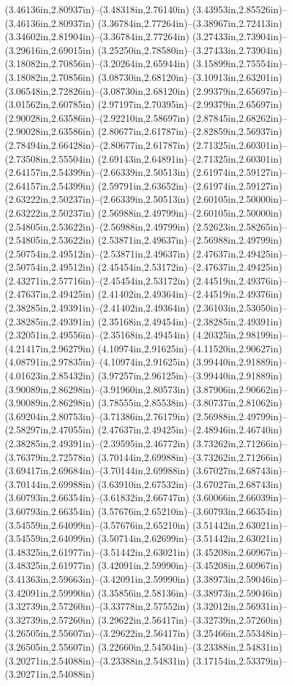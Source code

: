 (3.46136in,2.80937in)--(3.48318in,2.76140in) (3.43953in,2.85526in)--(3.46136in,2.80937in) (3.36784in,2.77264in)--(3.38967in,2.72413in) (3.34602in,2.81904in)--(3.36784in,2.77264in) (3.27433in,2.73904in)--(3.29616in,2.69015in) (3.25250in,2.78580in)--(3.27433in,2.73904in) (3.18082in,2.70856in)--(3.20264in,2.65944in) (3.15899in,2.75554in)--(3.18082in,2.70856in) (3.08730in,2.68120in)--(3.10913in,2.63201in) (3.06548in,2.72826in)--(3.08730in,2.68120in) (2.99379in,2.65697in)--(3.01562in,2.60785in) (2.97197in,2.70395in)--(2.99379in,2.65697in) (2.90028in,2.63586in)--(2.92210in,2.58697in) (2.87845in,2.68262in)--(2.90028in,2.63586in) (2.80677in,2.61787in)--(2.82859in,2.56937in) (2.78494in,2.66428in)--(2.80677in,2.61787in) (2.71325in,2.60301in)--(2.73508in,2.55504in) (2.69143in,2.64891in)--(2.71325in,2.60301in) (2.64157in,2.54399in)--(2.66339in,2.50513in) (2.61974in,2.59127in)--(2.64157in,2.54399in) (2.59791in,2.63652in)--(2.61974in,2.59127in) (2.63222in,2.50237in)--(2.66339in,2.50513in) (2.60105in,2.50000in)--(2.63222in,2.50237in) (2.56988in,2.49799in)--(2.60105in,2.50000in) (2.54805in,2.53622in)--(2.56988in,2.49799in) (2.52623in,2.58265in)--(2.54805in,2.53622in) (2.53871in,2.49637in)--(2.56988in,2.49799in) (2.50754in,2.49512in)--(2.53871in,2.49637in) (2.47637in,2.49425in)--(2.50754in,2.49512in) (2.45454in,2.53172in)--(2.47637in,2.49425in) (2.43271in,2.57716in)--(2.45454in,2.53172in) (2.44519in,2.49376in)--(2.47637in,2.49425in) (2.41402in,2.49364in)--(2.44519in,2.49376in) (2.38285in,2.49391in)--(2.41402in,2.49364in) (2.36103in,2.53050in)--(2.38285in,2.49391in) (2.35168in,2.49454in)--(2.38285in,2.49391in) (2.32051in,2.49556in)--(2.35168in,2.49454in) (4.20325in,2.98199in)--(4.21417in,2.96279in) (4.10974in,2.91625in)--(4.11520in,2.90627in) (4.08791in,2.97835in)--(4.10974in,2.91625in) (3.99440in,2.91889in)--(4.01623in,2.85432in) (3.97257in,2.96125in)--(3.99440in,2.91889in) (3.90089in,2.86298in)--(3.91960in,2.80573in) (3.87906in,2.90662in)--(3.90089in,2.86298in) (3.78555in,2.85538in)--(3.80737in,2.81062in) (3.69204in,2.80753in)--(3.71386in,2.76179in) (2.56988in,2.49799in)--(2.58297in,2.47055in) (2.47637in,2.49425in)--(2.48946in,2.46740in) (2.38285in,2.49391in)--(2.39595in,2.46772in) (3.73262in,2.71266in)--(3.76379in,2.72578in) (3.70144in,2.69988in)--(3.73262in,2.71266in) (3.69417in,2.69684in)--(3.70144in,2.69988in) (3.67027in,2.68743in)--(3.70144in,2.69988in) (3.63910in,2.67532in)--(3.67027in,2.68743in) (3.60793in,2.66354in)--(3.61832in,2.66747in) (3.60066in,2.66039in)--(3.60793in,2.66354in) (3.57676in,2.65210in)--(3.60793in,2.66354in) (3.54559in,2.64099in)--(3.57676in,2.65210in) (3.51442in,2.63021in)--(3.54559in,2.64099in) (3.50714in,2.62699in)--(3.51442in,2.63021in) (3.48325in,2.61977in)--(3.51442in,2.63021in) (3.45208in,2.60967in)--(3.48325in,2.61977in) (3.42091in,2.59990in)--(3.45208in,2.60967in) (3.41363in,2.59663in)--(3.42091in,2.59990in) (3.38973in,2.59046in)--(3.42091in,2.59990in) (3.35856in,2.58136in)--(3.38973in,2.59046in) (3.32739in,2.57260in)--(3.33778in,2.57552in) (3.32012in,2.56931in)--(3.32739in,2.57260in) (3.29622in,2.56417in)--(3.32739in,2.57260in) (3.26505in,2.55607in)--(3.29622in,2.56417in) (3.25466in,2.55348in)--(3.26505in,2.55607in) (3.22660in,2.54504in)--(3.23388in,2.54831in) (3.20271in,2.54088in)--(3.23388in,2.54831in) (3.17154in,2.53379in)--(3.20271in,2.54088in) 